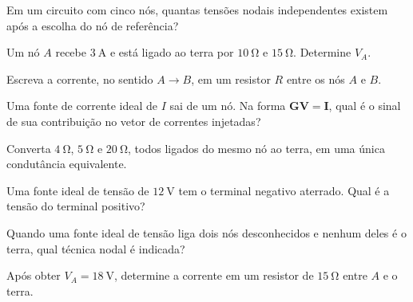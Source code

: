 \blocofixacao

\begin{questao}[1]{}
Em um circuito com cinco nós, quantas tensões nodais independentes existem após a escolha do nó de referência?
\end{questao}

\begin{questao}[1]{}
Um nó $A$ recebe $\SI{3}{\ampere}$ e está ligado ao terra por $\SI{10}{\ohm}$ e $\SI{15}{\ohm}$. Determine $V_A$.
\end{questao}

\begin{questao}[1]{}
Escreva a corrente, no sentido $A\to B$, em um resistor $R$ entre os nós $A$ e $B$.
\end{questao}

\begin{questao}[1]{}
Uma fonte de corrente ideal de $I$ sai de um nó. Na forma $\mathbf G\mathbf V=\mathbf I$, qual é o sinal de sua contribuição no vetor de correntes injetadas?
\end{questao}

\begin{questao}[1]{}
Converta $\SI{4}{\ohm}$, $\SI{5}{\ohm}$ e $\SI{20}{\ohm}$, todos ligados do mesmo nó ao terra, em uma única condutância equivalente.
\end{questao}

\begin{questao}[1]{}
Uma fonte ideal de tensão de $\SI{12}{\volt}$ tem o terminal negativo aterrado. Qual é a tensão do terminal positivo?
\end{questao}

\begin{questao}[1]{}
Quando uma fonte ideal de tensão liga dois nós desconhecidos e nenhum deles é o terra, qual técnica nodal é indicada?
\end{questao}

\begin{questao}[1]{}
Após obter $V_A=\SI{18}{\volt}$, determine a corrente em um resistor de $\SI{15}{\ohm}$ entre $A$ e o terra.
\end{questao}

